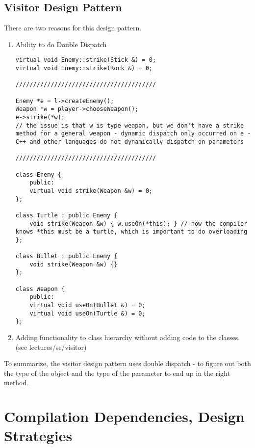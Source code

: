 \documentclass[12pt]{article}
\begin{document}
\subsection{Visitor Design Pattern}
There are two reasons for this design pattern.
\begin{enumerate}
    \item Ability to do Double Dispatch
\begin{lstlisting}
virtual void Enemy::strike(Stick &) = 0;
virtual void Enemy::strike(Rock &) = 0;

////////////////////////////////////////

Enemy *e = l->createEnemy();
Weapon *w = player->chooseWeapon();
e->strike(*w);
// the issue is that w is type weapon, but we don't have a strike method for a general weapon - dynamic dispatch only occurred on e - C++ and other languages do not dynamically dispatch on parameters

////////////////////////////////////////

class Enemy {
    public:
    virtual void strike(Weapon &w) = 0;
};

class Turtle : public Enemy {
    void strike(Weapon &w) { w.useOn(*this); } // now the compiler knows *this must be a turtle, which is important to do overloading
};

class Bullet : public Enemy {
    void strike(Weapon &w) {}
};

class Weapon {
    public:
    virtual void useOn(Bullet &) = 0;
    virtual void useOn(Turtle &) = 0;
};
\end{lstlisting}

\item Adding functionality to class hierarchy without adding code to the classes. (see lectures/se/visitor)
\end{enumerate}

To summarize, the visitor design pattern uses double dispatch - to figure out both the type of the object and the type of the parameter to end up in the right method.

\section{Compilation Dependencies, Design Strategies}
\end{document}
